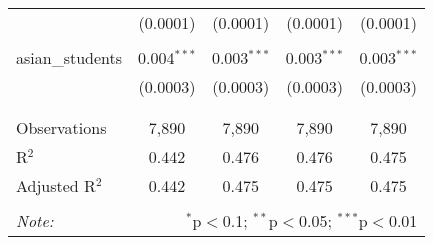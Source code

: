 \begin{table}[!htbp]
\begin{tabular}{@{\extracolsep{-2pt}}lcccc}
  & (0.0001) & (0.0001) & (0.0001) & (0.0001) \\ 
  & & & & \\ 
 asian\_students & 0.004$^{***}$ & 0.003$^{***}$ & 0.003$^{***}$ & 0.003$^{***}$ \\ 
  & (0.0003) & (0.0003) & (0.0003) & (0.0003) \\ 
  & & & & \\ 
\hline \\[-1.8ex] 
Observations & 7,890 & 7,890 & 7,890 & 7,890 \\ 
R$^{2}$ & 0.442 & 0.476 & 0.476 & 0.475 \\ 
Adjusted R$^{2}$ & 0.442 & 0.475 & 0.475 & 0.475 \\ 
\hline 
\hline \\[-1.8ex] 
\textit{Note:}  & \multicolumn{4}{r}{$^{*}$p$<$0.1; $^{**}$p$<$0.05; $^{***}$p$<$0.01} \\ 
\end{tabular} 
\end{table} 
